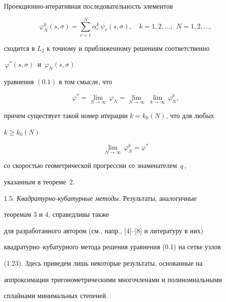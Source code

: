 \begin{thm}


Проекционно-итеративная последовательность элементов


$$


\varphi_N^k(s,\sigma )=\sum_{r=1}^N\alpha _r^k\, \psi_r(s,\sigma ),\quad


k=1,2,\dotsc;\ \ N=1,2,\dotsc,


$$


сходится в $L_2$ к точному и приближенному решениям соответственно


$\, \varphi ^\ast (s,\sigma )\, $ и $\, \varphi_N (s,\sigma )\, $


уравнения $(0.1)$ в том смысле, что


$$


\varphi ^\ast =\lim_{N\rightarrow \infty }\, \varphi_N =


\lim_{N\rightarrow \infty}\; \lim_{k\rightarrow \infty}\, \varphi_N ^k,


$$


причем существует такой номер итерации $k=k_0(N)$, что для любых


$k\geq k_0(N)$


$$


\lim_{N\rightarrow\infty }\, \varphi_N ^k=\varphi ^\ast


$$


со скоростью геометрической прогрессии со знаменателем $\, q\, $,


указанным в теореме~$2$.


\end{thm}





1.5. {\it Квадратурно-кубатурные методы.} Результаты, аналогичные 


теоремам 3 и 4, справедливы также


для разработанного автором (см., напр.,  [4]--[8] и литературу в них)


квадратурно--кубатурного метода ре\-ше\-ния уравнения (0.1) на сетке узлов 


(1.23). Здесь приведем лишь некоторые результаты, основанные на 


аппроксимации тригонометрическими многочленами и полиномиальными 


сплайнами минимальных степеней.  


\medskip





